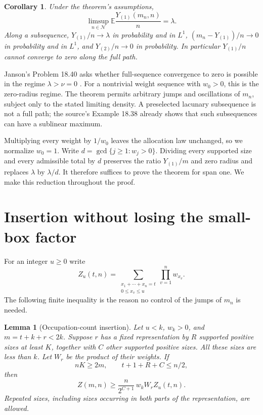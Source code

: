 \documentclass[11pt]{article}
\newtheorem{lemma}[theorem]{Lemma}
\newtheorem{corollary}[theorem]{Corollary}
\theoremstyle{remark}\newtheorem{remark}[theorem]{Remark}
\newcommand{\E}{\mathbb E}
\begin{document}
\begin{corollary}\label{cor:consequences}
Under the theorem's assumptions,
\[
 \limsup_{n\in\mathcal N}\E\frac{Y_{(1)}(m_n,n)}n=\lambda.
\]
Along a subsequence, $Y_{(1)}/n\to\lambda$ in probability and in $L^1$,
$(m_n-Y_{(1)})/n\to0$ in probability and in $L^1$, and $Y_{(2)}/n\to0$ in
probability. In particular $Y_{(1)}/n$ cannot converge to zero along the full
path.
\end{corollary}

Janson's Problem 18.40 asks whether full-sequence convergence to zero is
possible in the regime $\lambda>\nu=0$ \cite[Section 18.6, Problem 18.40]{Janson}.
For a nontrivial weight sequence with $w_0>0$, this is the zero-radius regime.
The theorem permits arbitrary jumps and oscillations of $m_n$, subject only
to the stated limiting density. A preselected lacunary subsequence is not a
full path; the source's Example 18.38 already shows that such subsequences
can have a sublinear maximum.

Multiplying every weight by $1/w_0$ leaves the allocation law unchanged, so
we normalize $w_0=1$. Write $d=\gcd\{j\ge1:w_j>0\}$. Dividing every supported
size and every admissible total by $d$ preserves the ratio $Y_{(1)}/m$ and
zero radius and replaces $\lambda$ by $\lambda/d$. It therefore suffices to
prove the theorem for span one. We make this reduction throughout the proof.

\section{Insertion without losing the small-box factor}
For an integer $u\ge0$ write
\[
 Z_u(t,n)=\sum_{\substack{x_1+\cdots+x_n=t\\0\le x_v\le u}}
             \prod_{v=1}^n w_{x_v}.
\]
The following finite inequality is the reason no control of the jumps of
$m_n$ is needed.

\begin{lemma}[Occupation-count insertion]\label{lem:insertion}
Let $u<k$, $w_k>0$, and $m=t+k+r<2k$. Suppose $r$ has a fixed representation
by $R$ supported positive sizes at least $K$, together with $C$ other
supported positive sizes. All these sizes are less than $k$. Let $W_r$ be
the product of their weights. If
\begin{equation}\label{eq:insertionconditions}
 nK\ge2m,\qquad t+1+R+C\le n/2,
\end{equation}
then
\begin{equation}\label{eq:insertion}
 Z(m,n)\ge\frac{n}{2^{C+1}}\,w_k W_r Z_u(t,n).
\end{equation}
Repeated sizes, including sizes occurring in both parts of the
representation, are allowed.
\end{lemma}
\end{document}
